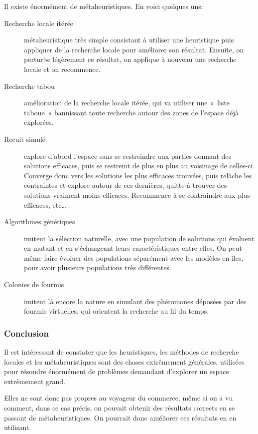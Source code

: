   Il existe énormément de métaheuristiques. En voici quelques uns:
  \begin{description}
  \item[Recherche locale itérée] métaheuristique très simple consistant à
    utiliser une heuristique puis appliquer de la recherche locale pour
    améliorer son résultat.  Ensuite, on perturbe légèrement ce résultat, on
    applique à nouveau une recherche locale et on recommence.
  \item[Recherche tabou] amélioration de la recherche locale itérée, qui va
    utiliser une «~liste taboue~» bannissant toute recherche autour des zones de
    l'espace déjà explorées.
  \item[Recuit simulé] explore d'abord l'espace sans se restreindre aux parties
    donnant des solutions efficaces, puis se restreint de plus en plus au
    voisinage de celles-ci. Converge donc vers les solutions les plus efficaces
    trouvées, puis relâche les contraintes et explore autour de ces dernières,
    quitte à trouver des solutions vraiment moins efficaces. Recommence à se
    contraindre aux plus efficaces, etc\dots
  \item[Algorithmes génétiques] imitent la sélection naturelle, avec une
    population de solutions qui évoluent en mutant et en s'échangeant leurs
    caractéristiques entre elles. On peut même faire évoluer des populations
    séparément avec les modèles en îles, pour avoir plusieurs populations très
    différentes.
  \item[Colonies de fourmis] imitent là encore la nature en simulant des
    phéromones déposées par des fourmis virtuelles, qui orientent la recherche
    au fil du temps.
  \end{description}

  \subsubsection{Conclusion}
    Il est intéressant de constater que les heuristiques, les méthodes de
    recherche locales et les métaheuristiques sont des choses extrêmement
    générales, utilisées pour résoudre énormément de problèmes demandant
    d'explorer un espace extrêmement grand.

    Elles ne sont donc pas propres au voyageur du commerce, même si on a vu
    comment, dans ce cas précis, on pouvait obtenir des résultats corrects en
    se passant de métaheuristiques. On pourrait donc améliorer ces résultats en
    en utilisant.
